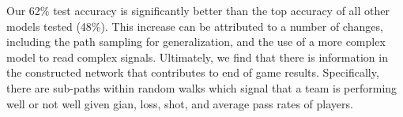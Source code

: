 Our 62\% test accuracy is significantly better than the top accuracy of all other models tested (48\%). This increase can be attributed to a number of changes, including the path sampling for generalization, and the use of a more complex model to read complex signals. Ultimately, we find that there is information in the constructed network that contributes to end of game results. Specifically, there are sub-paths within random walks which signal that a team is performing well or not well given gian, loss, shot, and average pass rates of players. 



